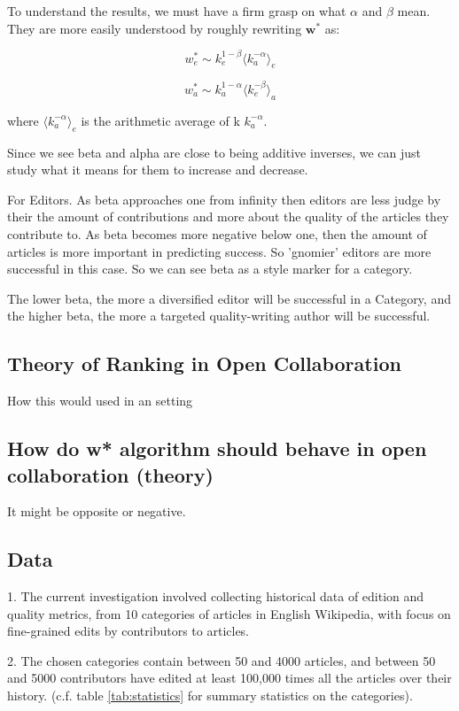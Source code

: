 \documentclass{acm_proc_article-sp}
\begin{document}
To understand the results, we must have a firm grasp on what $\alpha$ and $\beta$ mean. They are more easily understood by roughly rewriting $\mathbf{w^*}$ as:

$$w^{*}_{e} \sim k^{1-\beta}_{e} \langle k_{a}^{-\alpha}\rangle_e $$


$$w^{*}_{a} \sim k^{1-\alpha}_{a} \langle k_{e}^{-\beta}\rangle_a $$

where $\langle k_{a}^{-\alpha}\rangle_e$ is the arithmetic average of k  $k_{a}^{-\alpha}$. 

Since we see beta and alpha are close to being additive inverses, we can just study what it means for them to increase and decrease.

For Editors.
As beta approaches one from infinity then editors are less judge by their the amount of contributions and more about the quality of the articles they contribute to. As beta becomes more negative below one, then the amount of articles is more important in predicting success.  So 'gnomier' editors are more successful in this case. So we can see beta as a style marker for a category.

The lower beta, the more a diversified editor will be successful in a Category, and the higher beta, the more a targeted quality-writing author will be successful.


\subsection{Theory of Ranking in Open Collaboration}
How this would used in an setting

\subsection{How do w* algorithm should behave in open collaboration (theory)}

It might be opposite or negative.

\subsection{Data}
1. The current investigation involved collecting historical data of edition and quality metrics, from 10 categories of articles in English Wikipedia, with focus on fine-grained edits by contributors to articles.

2. The chosen categories contain between 50 and 4000 articles, and between 50 and 5000 contributors have edited at least 100,000 times all the articles over their history. (c.f. table \ref{tab:statistics} for summary statistics on the categories). 
\end{document}
